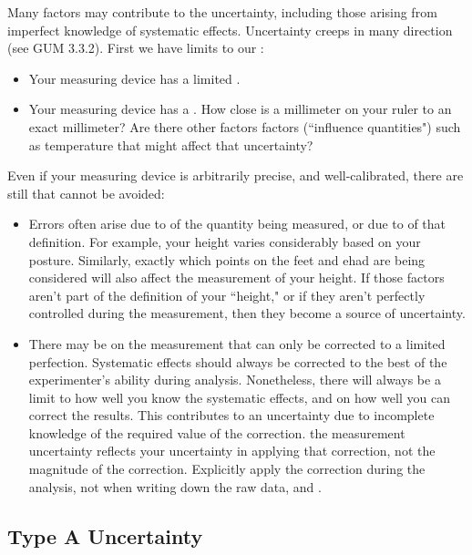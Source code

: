 Many factors may contribute to the uncertainty, including those arising from imperfect knowledge of systematic effects. Uncertainty creeps in many direction (see GUM 3.3.2). First we have limits to our :
\begin{itemize}
    \item Your measuring device has a limited .
    \item Your measuring device has a . How close is a millimeter on your ruler to an exact millimeter? Are there other factors factors (``influence quantities") such as temperature that might affect that uncertainty?
\end{itemize}
\noindent Even if your measuring device is arbitrarily precise, and well-calibrated, there are still  that cannot be avoided:
\begin{itemize}
    \item Errors often arise due to  of the quantity being measured, or due to  of that definition. For example, your height varies considerably based on your posture. Similarly, exactly which points on the feet and ehad are being considered will also affect the measurement of your height. If those factors aren't part of the definition of your ``height," or if they aren't perfectly controlled during the measurement, then they become a source of uncertainty.
    \item There may be  on the measurement that can only be corrected to a limited perfection. Systematic effects should always be corrected to the best of the experimenter's ability during analysis. Nonetheless, there will always be a limit to how well you know the systematic effects, and on how well you can correct the results. This contributes to an uncertainty due to incomplete knowledge of the required value of the correction.  the measurement uncertainty reflects your uncertainty in applying that correction, not the magnitude of the correction. Explicitly apply the correction during the analysis, not when writing down the raw data, and .
\end{itemize}




\subsection{Type A Uncertainty}


